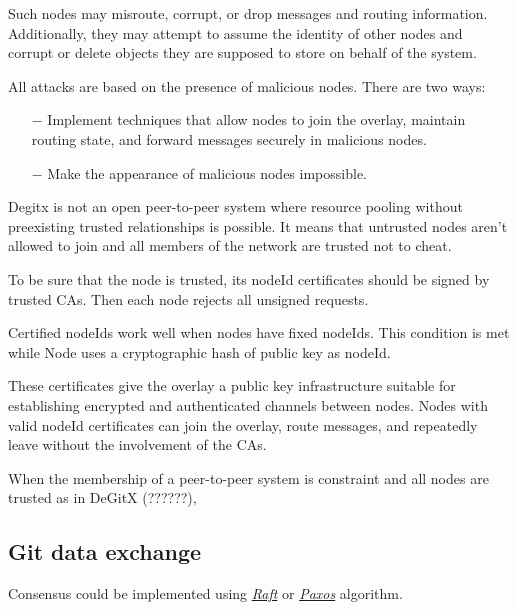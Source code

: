 \documentclass[acmlarge, screen, nonacm, 11pt]{acmart}
\begin{document}
Such nodes may misroute, corrupt, or drop messages and routing information.
Additionally, they may attempt to assume the identity of other nodes and corrupt or delete objects
they are supposed to store on behalf of the system.

All attacks are based on the presence of malicious nodes.
There are two ways:
\begin{itemize}
  \item[$-$] Implement techniques that allow nodes to join the overlay, maintain routing state, and forward messages securely in malicious nodes.
  \item[$-$] Make the appearance of malicious nodes impossible.
\end{itemize}

Degitx is not an open peer-to-peer system
where resource pooling without preexisting trusted relationships is possible.
It means that untrusted nodes aren't allowed to join
and all members of the network are trusted not to cheat.

To be sure that the node is trusted, its nodeId certificates should be signed by trusted CAs.
Then each node rejects all unsigned requests.

Certified nodeIds work well when nodes have fixed nodeIds.
This condition is met while Node uses a cryptographic hash of public key as nodeId.

These certificates give the overlay a public key infrastructure
suitable for establishing encrypted and authenticated channels between nodes.
Nodes with valid nodeId certificates can join the overlay, route messages,
and repeatedly leave without the involvement of the CAs.

When the membership of a peer-to-peer system is constraint and all nodes are trusted as in DeGitX (??????),

\subsection{Git data exchange}
\label{sec:data}
Consensus could be implemented using \emph{\href{https://raft.github.io/raft.pdf}{Raft}} or
\emph{\href{http://www.cs.yale.edu/homes/aspnes/pinewiki/Paxos.html}{Paxos}} algorithm.
\end{document}
